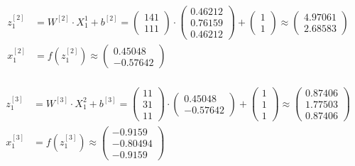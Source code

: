 \documentclass[12pt]{article}
\begin{document}
\begin{enumerate}[leftmargin=\labelsep]
            \begin{align*}
              z^{[2]}_1 &= {W}^{[2]} \cdot {X}^{1}_1 + {b}^{[2]} = \begin{pmatrix} 1 4 1 \\ 1 1 1\end{pmatrix} \cdot  \begin{pmatrix} 0.46212 \\ 0.76159 \\ 0.46212 \end{pmatrix} +
               \begin{pmatrix} 1 \\ 1\end{pmatrix} \approx \begin{pmatrix} 4.97061 \\ 2.68583\end{pmatrix} \\
              {x}^{[2]}_1 &= f({z}^{[2]}_1) \approx \begin{pmatrix} 0.45048 \\ -0.57642\end{pmatrix} \\
            \end{align*}

            \begin{align*}
              z^{[3]}_1 &= {W}^{[3]} \cdot {X}^{2}_1 + {b}^{[3]} = \begin{pmatrix} 1 1 \\ 3 1 \\ 1 1\end{pmatrix} \cdot  \begin{pmatrix} 0.45048 \\ -0.57642\end{pmatrix} +
               \begin{pmatrix} 1 \\ 1 \\ 1\end{pmatrix} \approx \begin{pmatrix} 0.87406 \\ 1.77503 \\ 0.87406\end{pmatrix} \\
              {x}^{[3]}_1 &= f({z}^{[3]}_1) \approx \begin{pmatrix} -0.9159 \\ -0.80494 \\ -0.9159\end{pmatrix} \\
            \end{align*}



\end{enumerate}
\end{document}
